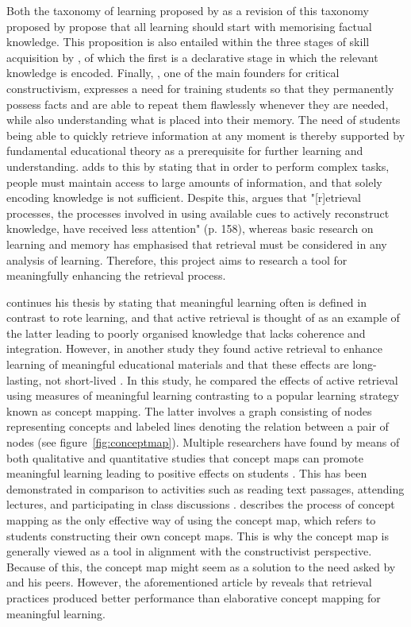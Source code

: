 Both the taxonomy of learning proposed by  as a revision of this taxonomy proposed by  propose that all learning should start with memorising factual knowledge. This proposition is also entailed within the three stages of skill acquisition by , of which the first is a declarative stage in which the relevant knowledge is encoded. Finally, , one of the main founders for critical constructivism, expresses a need for training students so that they permanently possess facts and are able to repeat them flawlessly whenever they are needed, while also understanding what is placed into their memory. The need of students being able to quickly retrieve information at any moment is thereby supported by fundamental educational theory as a prerequisite for further learning and understanding.  adds to this by stating that in order to perform complex tasks, people must maintain access to large amounts of information, and that solely encoding knowledge is not sufficient. Despite this,  argues that "[r]etrieval processes, the processes involved in using available cues to actively reconstruct knowledge, have received less attention" (p. 158), whereas basic research on learning and memory has emphasised that retrieval must be considered in any analysis of learning. Therefore, this project aims to research a tool for meaningfully enhancing the retrieval process. 

 continues his thesis by stating that meaningful learning often is defined in contrast to rote learning, and that active retrieval is thought of as an example of the latter leading to poorly organised knowledge that lacks coherence and integration. However, in another study they found active retrieval to enhance learning of meaningful educational materials and that these effects are long-lasting, not short-lived \cite{karpicke2}. In this study, he compared the effects of active retrieval using measures of meaningful learning contrasting to a popular learning strategy known as concept mapping. The latter involves a graph consisting of nodes representing concepts and labeled lines denoting the relation between a pair of nodes \cite{ruiz1} (see figure~\ref{fig:conceptmap}). Multiple researchers have found by means of both qualitative and quantitative studies that concept maps can promote meaningful learning leading to positive effects on students \cite{hwang2, subramaniam, canas}. This has been demonstrated in comparison to activities such as reading text passages, attending lectures, and participating in class discussions \cite{singh, nesbit2}.  describes the process of concept mapping as the only effective way of using the concept map, which refers to students constructing their own concept maps. This is why the concept map is generally viewed as a tool in alignment with the constructivist perspective. Because of this, the concept map might seem as a solution to the need asked by  and his peers. However, the aforementioned article by  reveals that retrieval practices produced better performance than elaborative concept mapping for meaningful learning.

